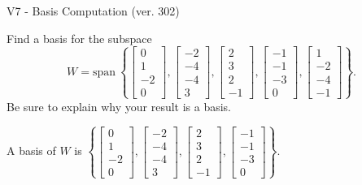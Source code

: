 \begin{exercise}
  \begin{exerciseTitle}V7 - Basis Computation (ver. 302)\end{exerciseTitle}
  \begin{exerciseStatement}
    Find a basis for the subspace 
\[W=\mathrm{span}\ \left\{\left[\begin{array}{r}
0 \\
1 \\
-2 \\
0
\end{array}\right] , \left[\begin{array}{r}
-2 \\
-4 \\
-4 \\
3
\end{array}\right] , \left[\begin{array}{r}
2 \\
3 \\
2 \\
-1
\end{array}\right] , \left[\begin{array}{r}
-1 \\
-1 \\
-3 \\
0
\end{array}\right] , \left[\begin{array}{r}
1 \\
-2 \\
-4 \\
-1
\end{array}\right]\right\}.\]
 Be sure to explain why your result is a basis.


  \end{exerciseStatement}
  \begin{exerciseAnswer}
   A basis of \(W\) is  \(\left\{\left[\begin{array}{r}
0 \\
1 \\
-2 \\
0
\end{array}\right] , \left[\begin{array}{r}
-2 \\
-4 \\
-4 \\
3
\end{array}\right] , \left[\begin{array}{r}
2 \\
3 \\
2 \\
-1
\end{array}\right] , \left[\begin{array}{r}
-1 \\
-1 \\
-3 \\
0
\end{array}\right]\right\}\).
  


  \end{exerciseAnswer}
\end{exercise}